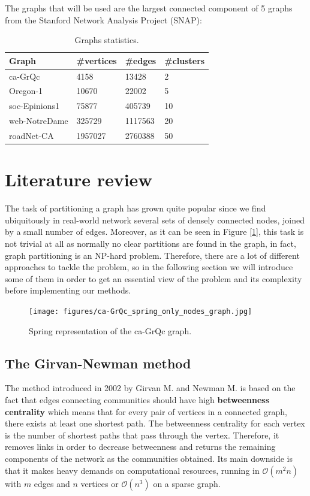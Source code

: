 \documentclass[11pt]{extarticle}
\begin{document}
The graphs that will be used are the largest connected component of 5 graphs from the Stanford Network Analysis Project (SNAP): 

\begin{table}[h]
\centering
\begin{tabular}{|l|l|l|l|}
\hline \textbf{Graph} & \textbf{\#vertices} & \textbf{\#edges} & \textbf{\#clusters} \\ \hline
ca-GrQc & 4158 & 13428 & 2 \\ \hline
Oregon-1 & 10670 & 22002 & 5 \\ \hline
soc-Epinions1 & 75877 & 405739 & 10 \\ \hline
web-NotreDame & 325729 & 1117563 & 20 \\ \hline
roadNet-CA & 1957027 & 2760388 & 50 \\ \hline
\end{tabular}
\caption{Graphs statistics.}
\end{table}

\section{Literature review}

The task of partitioning a graph has grown quite popular since we find ubiquitously in real-world network several sets of densely connected nodes, joined by a small number of edges. Moreover, as it can be seen in Figure [\ref{drawing}], this task is not trivial at all as normally no clear partitions are found in the graph, in fact, graph partitioning is an NP-hard problem. Therefore, there are a lot of different approaches to tackle the problem, so in the following section we will introduce some of them in order to get an essential view of the problem and its complexity before implementing our methods.

\begin{figure}[h]
\centering
\texttt{[image: figures/ca-GrQc\_spring\_only\_nodes\_graph.jpg]}
\caption{Spring representation of the ca-GrQc graph.}
\label{drawing}
\end{figure}

\subsection{The Girvan-Newman method}

The method introduced in 2002 by Girvan M. and Newman M. \cite{Girvan2002} is based on the fact that edges connecting communities should have high \textbf{betweenness centrality} which means that for every pair of vertices in a connected graph, there exists at least one shortest path. The betweenness centrality for each vertex is the number of shortest paths that pass through the vertex. Therefore, it removes links in order to decrease betweenness and returns the remaining components of the network as the communities obtained. Its main downside is that it makes heavy demands on computational resources, running in $\mathcal{O}(m^2n)$ with $m$ edges and $n$ vertices or $\mathcal{O}(n^3)$ on a sparse graph.
\end{document}
